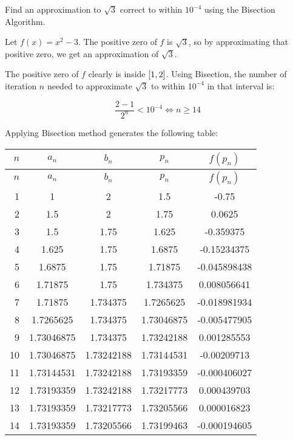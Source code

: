 \documentclass[../../../../Assignments.tex]{subfiles}
\begin{document}
\begin{exercise}
    Find an approximation to \(\sqrt{3}\) correct to within \(10^{−4}\) using
    the Bisection Algorithm.
\end{exercise}

\begin{solution}
    Let \(f(x) = x^2 - 3\). The positive zero of \(f\) is \(\sqrt{3}\), so by
    approximating that positive zero, we get an approximation of \(\sqrt{3}\).

    The positive zero of \(f\) clearly is inside \(\interval{1}{2}\). Using
    Bisection, the number of iteration \(n\) needed to approximate \(\sqrt{3}\)
    to within \(10^{-4}\) in that interval is:

    \[\frac{2 - 1}{2^n} < 10^{-4} \iff n \geq 14\]

    Applying Bisection method generates the following table:

    \begin{longtable}{r S[table-format=1.8] S[table-format=1.8] S[table-format=1.8] S[table-format=-1.9]}
        \toprule
        \(n\)  &   {\(a_n\)}   &   {\(b_n\)}   &   {\(p_n\)}   &  {\(f(p_n)\)}  \\
        \midrule
        \endfirsthead
        \(n\)  &   {\(a_n\)}   &   {\(b_n\)}   &   {\(p_n\)}   &  {\(f(p_n)\)}  \\
        \midrule
          &  1            &  2            &  1.5          &  -0.75         \\
            2  &  1.5          &  2            &  1.75         &   0.0625       \\
            3  &  1.5          &  1.75         &  1.625        &  -0.359375     \\
            4  &  1.625        &  1.75         &  1.6875       &  -0.15234375   \\
            5  &  1.6875       &  1.75         &  1.71875      &  -0.045898438  \\
            6  &  1.71875      &  1.75         &  1.734375     &   0.008056641  \\
            7  &  1.71875      &  1.734375     &  1.7265625    &  -0.018981934  \\
            8  &  1.7265625    &  1.734375     &  1.73046875   &  -0.005477905  \\
            9  &  1.73046875   &  1.734375     &  1.73242188   &   0.001285553  \\
           10  &  1.73046875   &  1.73242188   &  1.73144531   &  -0.00209713   \\
           11  &  1.73144531   &  1.73242188   &  1.73193359   &  -0.000406027  \\
           12  &  1.73193359   &  1.73242188   &  1.73217773   &   0.000439703  \\
           13  &  1.73193359   &  1.73217773   &  1.73205566   &   0.000016823  \\
           14  &  1.73193359   &  1.73205566   &  1.73199463   &  -0.000194605  \\
       \bottomrule
    \end{longtable}


\end{solution}
\end{document}
